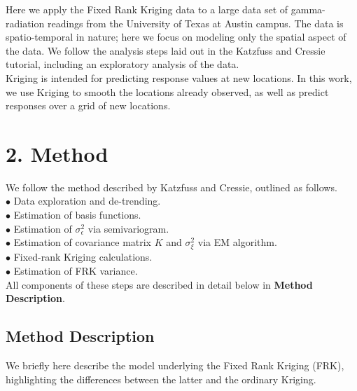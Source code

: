 \documentclass[11pt]{article}
\begin{document}
Here we apply the Fixed Rank Kriging data to a large data set of gamma-radiation readings from the University of Texas at Austin campus.  The data is spatio-temporal in nature; here we focus on modeling only the spatial aspect of the data.  We follow the analysis steps laid out in the Katzfuss and Cressie tutorial, including an exploratory analysis of the data. \\

Kriging is intended for predicting response values at new locations.  In this work, we use Kriging to smooth the locations already observed, as well as predict responses over a grid of new locations. \\

\newpage
\section{2. Method}

We follow the method described by Katzfuss and Cressie, outlined as follows. \\
$\bullet$ Data exploration and de-trending. \\
$\bullet$ Estimation of basis functions. \\
$\bullet$ Estimation of $\sigma^2_\epsilon$ via semivariogram. \\
$\bullet$ Estimation of covariance matrix $K$ and $\sigma^2_\xi$ via EM algorithm. \\
$\bullet$ Fixed-rank Kriging calculations. \\
$\bullet$ Estimation of FRK variance. \\

All components of these steps are described in detail below in \textbf{Method Description}. \\


\subsection{Method Description}

We briefly here describe the model underlying the Fixed Rank Kriging (FRK), highlighting the differences between the latter and the ordinary Kriging. \\
\end{document}
